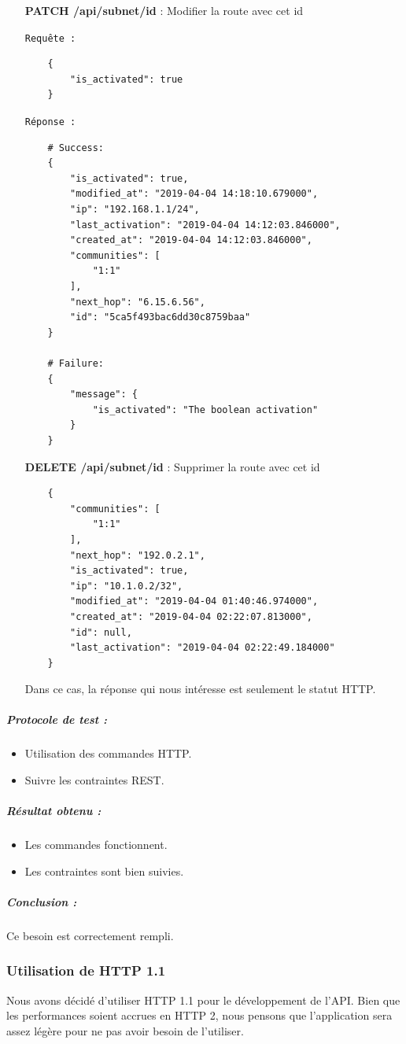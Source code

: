 \begin{itemize}
    \item [\textbf{PATCH /api/subnet/id}] : Modifier la route avec cet id
    
    \texttt{Requête :}
    \begin{verbatim}
    {
        "is_activated": true
    }
    \end{verbatim}
    
    \texttt{Réponse :}
    \begin{verbatim}
    # Success:
    {
        "is_activated": true,
        "modified_at": "2019-04-04 14:18:10.679000",
        "ip": "192.168.1.1/24",
        "last_activation": "2019-04-04 14:12:03.846000",
        "created_at": "2019-04-04 14:12:03.846000",
        "communities": [
            "1:1"
        ],
        "next_hop": "6.15.6.56",
        "id": "5ca5f493bac6dd30c8759baa"
    }

    # Failure:
    {
        "message": {
            "is_activated": "The boolean activation"
        }
    }
    \end{verbatim}

    \item [\textbf{DELETE /api/subnet/id}] : Supprimer la route avec cet id
    \begin{verbatim}
    {
        "communities": [
            "1:1"
        ],
        "next_hop": "192.0.2.1",
        "is_activated": true,
        "ip": "10.1.0.2/32",
        "modified_at": "2019-04-04 01:40:46.974000",
        "created_at": "2019-04-04 02:22:07.813000",
        "id": null,
        "last_activation": "2019-04-04 02:22:49.184000"
    }
    \end{verbatim}
    Dans ce cas, la réponse qui nous intéresse est seulement le statut HTTP.
\end{itemize}

\subparagraph{Protocole de test :}
\begin{itemize}
    \item Utilisation des commandes HTTP.
    \item Suivre les contraintes REST.
\end{itemize}
\subparagraph{Résultat obtenu :}
    \begin{itemize}
    \item Les commandes fonctionnent.
    \item Les contraintes sont bien suivies.
\end{itemize}
\subparagraph{Conclusion :}Ce besoin est correctement rempli.

\subsubsection{Utilisation de HTTP 1.1}
Nous avons décidé d'utiliser HTTP 1.1 pour le développement de l'API. Bien que les performances soient accrues en HTTP 2, nous pensons que l'application sera assez légère pour ne pas avoir besoin de l'utiliser.


